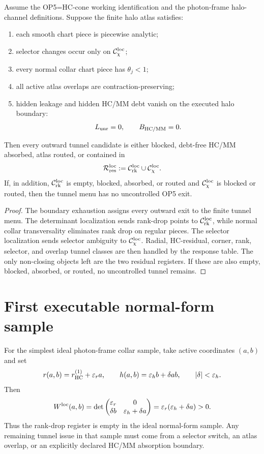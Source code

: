 \begin{theorem}
Assume the OP5=HC-cone working identification and the photon-frame halo-channel definitions. Suppose the finite halo atlas satisfies:
\begin{enumerate}
\item each smooth chart piece is piecewise analytic;
\item selector changes occur only on \(\mathcal C_{\chi}^{\mathrm{loc}}\);
\item every normal collar chart piece has \(\theta_j<1\);
\item all active atlas overlaps are contraction-preserving;
\item hidden leakage and hidden HC/MM debt vanish on the executed halo boundary:
\[
L_{\mathrm{unr}}=0,
\qquad
B_{\mathrm{HC}/\mathrm{MM}}=0.
\]
\end{enumerate}
Then every outward tunnel candidate is either blocked, debt-free HC/MM absorbed, atlas routed, or contained in
\[
\mathcal R_{\mathrm{res}}^{\mathrm{loc}}:=\mathcal C_{\mathrm{rk}}^{\mathrm{loc}}\cup\mathcal C_{\chi}^{\mathrm{loc}}.
\]
If, in addition, \(\mathcal C_{\mathrm{rk}}^{\mathrm{loc}}\) is empty, blocked, absorbed, or routed and \(\mathcal C_{\chi}^{\mathrm{loc}}\) is blocked or routed, then the tunnel menu has no uncontrolled OP5 exit.
\end{theorem}

\begin{proof}
The boundary exhaustion assigns every outward exit to the finite tunnel menu. The determinant localization sends rank-drop points to \(\mathcal C_{\mathrm{rk}}^{\mathrm{loc}}\), while normal collar transversality eliminates rank drop on regular pieces. The selector localization sends selector ambiguity to \(\mathcal C_{\chi}^{\mathrm{loc}}\). Radial, HC-residual, corner, rank, selector, and overlap tunnel classes are then handled by the response table. The only non-closing objects left are the two residual registers. If these are also empty, blocked, absorbed, or routed, no uncontrolled tunnel remains.
\end{proof}

\section{First executable normal-form sample}

For the simplest ideal photon-frame collar sample, take active coordinates \((a,b)\) and set
\[
r(a,b)=r_{\mathrm{HC}}^{(1)}+\varepsilon_r a,
\qquad
h(a,b)=\varepsilon_h b+\delta ab,
\qquad
|\delta|<\varepsilon_h.
\]
Then
\[
W^{\mathrm{loc}}(a,b)
=
\det
\begin{pmatrix}
\varepsilon_r & 0\\
\delta b & \varepsilon_h+\delta a
\end{pmatrix}
=
\varepsilon_r(\varepsilon_h+\delta a)>0.
\]
Thus the rank-drop register is empty in the ideal normal-form sample. Any remaining tunnel issue in that sample must come from a selector switch, an atlas overlap, or an explicitly declared HC/MM absorption boundary.

